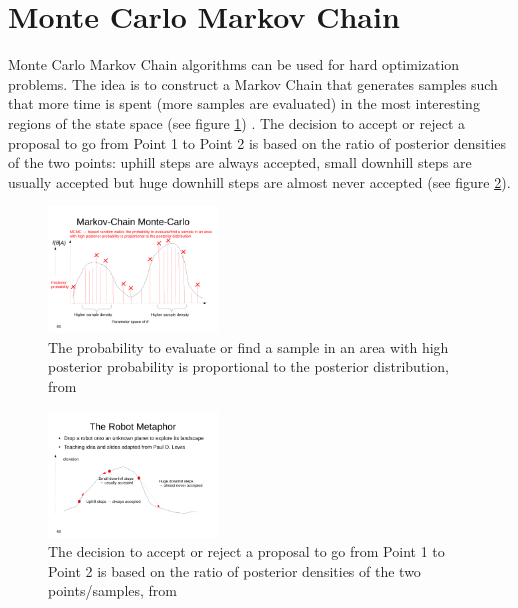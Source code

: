 \documentclass[10pt,twocolumn,letterpaper]{article}
\begin{document}
\section{Monte Carlo Markov Chain} \label{sec:MCMC}

Monte Carlo Markov Chain algorithms can be used for hard optimization problems. The idea is to construct a Markov Chain that generates samples such that more time is spent (more samples are evaluated) in the most interesting regions of the state space (see figure \ref{fig:MCMC1}) \cite{MCMC}. The decision to accept or reject a proposal to go from Point 1 to Point 2 is based on the ratio of posterior densities of the two points: uphill steps are always accepted, small downhill steps are usually accepted but huge downhill steps are almost never accepted (see figure \ref{fig:MCMC2}). 


\begin{figure}
	\begin{center}
		\includegraphics[trim = 0cm 1.5cm 1cm 5.4cm, clip, width=0.4\textwidth]{lecture12-seiten-46}
	\end{center}
	\caption{The probability to evaluate or find a sample in an area with high posterior probability is proportional to the posterior distribution, from \cite{MCMC}}
	\label{fig:MCMC1}
\end{figure}

\begin{figure}
	\begin{center}
		\includegraphics[trim = 0cm 4cm 1cm 7cm, clip, width=0.4\textwidth]{lecture12-seiten-48}
	\end{center}
	\caption{The decision to accept or reject a proposal to go from Point 1 to Point 2 is based on the ratio of posterior densities of the two points/samples, from \cite{MCMC}}
	\label{fig:MCMC2}
\end{figure}
\end{document}
